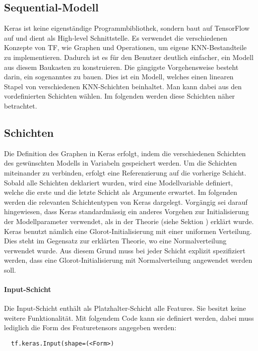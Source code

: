 \subsection{Sequential-Modell}
Keras ist keine eigenständige Programmbibliothek, sondern baut auf
TensorFlow auf und dient als High-level Schnittstelle.
Es verwendet die verschiedenen Konzepte von TF, wie Graphen und Operationen,
um eigene KNN-Bestandteile zu implementieren.
Dadurch ist es für den Benutzer deutlich einfacher, ein Modell aus diesem Baukasten
zu konstruieren.
\para{}
Die gängigste Vorgehensweise besteht darin, ein sogenanntes
 zu bauen.
Dies ist ein Modell, welches einen linearen Stapel von verschiedenen
KNN-Schichten beinhaltet. Man kann dabei aus den vordefinierten Schichten
wählen. Im folgenden werden diese Schichten näher betrachtet.

\subsection{Schichten}
Die Definition des Graphen in Keras erfolgt, indem die verschiedenen Schichten
des gewünschten Modells in Variabeln gespeichert werden.
Um die Schichten miteinander zu verbinden, erfolgt eine Referenzierung auf die
vorherige Schicht.
Sobald alle Schichten deklariert wurden, wird eine Modellvariable definiert,
welche die erste und die letzte Schicht als Argumente erwartet.
\para{}
Im folgenden werden die relevanten Schichtentypen von Keras dargelegt.
\para{}
Vorgängig sei darauf hingewiesen, dass Keras standardmässig ein anderes Vorgehen
zur Initialisierung der Modellparameter verwendet, als in der Theorie (siehe
Sektion ) erklärt wurde.
Keras benutzt nämlich eine Glorot-Initialisierung mit einer uniformen Verteilung.
Dies steht im Gegensatz zur erklärten Theorie, wo eine Normalverteilung verwendet wurde.
Aus diesem Grund muss bei jeder Schicht explizit spezifiziert werden, dass eine
Glorot-Initialisierung mit Normalverteilung angewendet werden soll.

\paragraph{Input-Schicht}
Die Input-Schicht enthält als Platzhalter-Schicht alle Features. Sie besitzt keine
weitere Funktionalität. Mit folgendem Code kann sie definiert werden, dabei muss
lediglich die Form des Featuretensors angegeben werden:
\begin{verbatim}
  tf.keras.Input(shape=(<Form>)
\end{verbatim}

